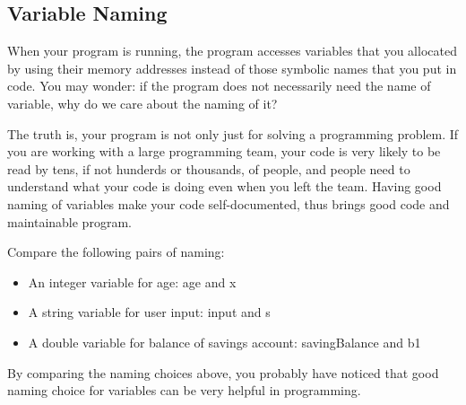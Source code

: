\documentclass[../main.tex]{subfiles}
\begin{document}
\subsection{Variable Naming}
When your program is running, the program accesses variables that you allocated
by using their memory addresses instead of those symbolic names that you put in
code. You may wonder: if the program does not necessarily need the name of
variable, why do we care about the naming of it?

The truth is, your program is not only just for solving a programming problem.
If you are working with a large programming team, your code is very likely to
be read by tens, if not hunderds or thousands, of people, and people need to
understand what your code is doing even when you left the team. Having good
naming of variables make your code self-documented, thus brings good code and
maintainable program.

Compare the following pairs of naming:
\begin{itemize}
    \item An integer variable for age: age and x
    \item A string variable for user input: input and s
    \item A double variable for balance of savings account: savingBalance and b1
\end{itemize}
By comparing the naming choices above, you probably have noticed that good
naming choice for variables can be very helpful in programming. 
\end{document}

